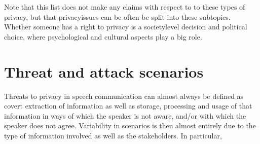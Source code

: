 \documentclass[letterpaper,10pt,english]{jupyterBook}
\begin{document}
\sphinxAtStartPar
Note that this list does not make any claims with respect to  to
these types of privacy, but that privacy\sphinxhyphen{}issues can be often be split
into these sub\sphinxhyphen{}topics. Whether someone has a right to privacy is a
society\sphinxhyphen{}level decision and political choice, where psychological and
cultural aspects play a big role.


\section{Threat and attack scenarios}
\label{\detokenize{Security_and_privacy:threat-and-attack-scenarios}}
\sphinxAtStartPar
Threats to privacy in speech communication can almost always be defined
as covert extraction of information as well as storage, processing and
usage of that information in ways of which the speaker is not aware,
and/or with which the speaker does not agree. Variability in scenarios
is then almost entirely due to the type of information involved as well
as the stakeholders. In particular,
\end{document}
